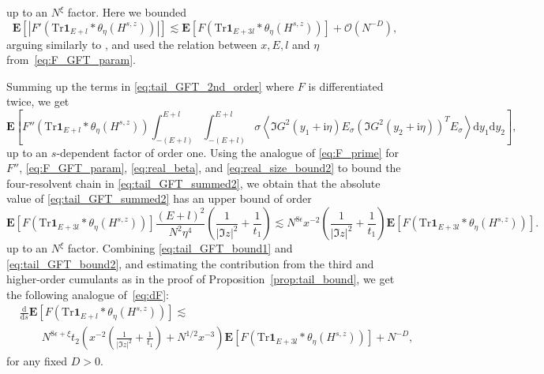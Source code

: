 \documentclass[10pt]{amsart}
\numberwithin{equation}{section}
\newcommand{\dif}{\mathrm{d}}
\newcommand{\E}{\mathbf{E}}
\newcommand{\ii}{\mathrm{i}}
\begin{document}
up to an $N^\xi$ factor. Here we bounded
\begin{equation}
\E\left[ \left\vert F'\left(\mathrm{Tr}\bm{1}_{E+l}*\theta_\eta(H^{s,z})\right)\right\vert\right]\lesssim\E\left[F\left(\mathrm{Tr}\bm{1}_{E+3l}*\theta_\eta(H^{s,z})\right)\right]+\mathcal{O}(N^{-D}),
\label{eq:F_prime}
\end{equation}
arguing similarly to \cite[Eq.(2.43)--(2.46)]{small_dev}, and used the relation between $x,E,l$ and $\eta$ from~\eqref{eq:F_GFT_param}.

Summing up the terms in \eqref{eq:tail_GFT_2nd_order} where $F$ is differentiated twice, we get
\begin{equation}
\E\left[F''\left(\mathrm{Tr}\bm{1}_{E+l}*\theta_\eta(H^{s,z})\right)\int_{-(E+l)}^{E+l}\int_{-(E+l)}^{E+l} \sigma \left\langle \Im G^2(y_1+\ii\eta)E_\sigma \left(\Im G^2(y_2+\ii\eta)\right)^TE_\sigma\right\rangle\dif y_1\dif y_2\right],
\label{eq:tail_GFT_summed2}
\end{equation}
up to an $s$-dependent factor of order one. Using the analogue of \eqref{eq:F_prime} for $F''$, \eqref{eq:F_GFT_param}, \eqref{eq:real_beta}, and \eqref{eq:real_size_bound2} to bound the four-resolvent chain in \eqref{eq:tail_GFT_summed2}, we obtain that the absolute value of \eqref{eq:tail_GFT_summed2} has an upper bound of order
\begin{equation}
\E\left[F\left(\mathrm{Tr}\bm{1}_{E+3l}\!*\!\theta_\eta(H^{s,z})\right)\right]\! \frac{(E+l)^2}{N^2\eta^4}\!\left(\frac{1}{|\Im z|^2}\! + \!\frac{1}{t_1}\right)\!\lesssim\! N^{8\epsilon} x^{-2}\!\!\left(\frac{1}{|\Im z|^2}\!+\!\frac{1}{t_1}\right)\E\left[F\left(\mathrm{Tr}\bm{1}_{E+3l}*\theta_\eta(H^{s,z})\right)\right]\!.
\label{eq:tail_GFT_bound2}
\end{equation}
up to an $N^\xi$ factor. Combining \eqref{eq:tail_GFT_bound1} and \eqref{eq:tail_GFT_bound2}, and estimating the contribution from the third and higher-order cumulants as in the proof of Proposition~\ref{prop:tail_bound}, we get the following analogue of~\eqref{eq:dF}:
\begin{equation}
\begin{split}
&\frac{\dif}{\dif s}\E\left[F\left(\mathrm{Tr}\bm{1}_{E+l}*\theta_\eta(H^{s,z})\right)\right]\lesssim\\
&\qquad N^{8\epsilon+\xi}t_2\left(x^{-2}\left(\frac{1}{|\Im z|^2}+\frac{1}{t_1}\right)+N^{1/2}x^{-3}\right)\E\left[F\left(\mathrm{Tr}\bm{1}_{E+3l}*\theta_\eta(H^{s,z})\right)\right] +N^{-D},
\end{split}
\label{eq:real_F_dif}
\end{equation}
for any fixed $D>0$.
\end{document}
